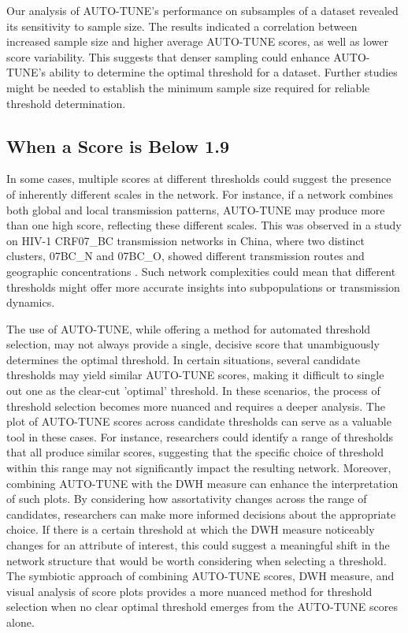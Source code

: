 \documentclass[utf8]{FrontiersinHarvard} %
\begin{document}
Our analysis of AUTO-TUNE's performance on subsamples of a dataset revealed its
sensitivity to sample size. The results indicated a correlation between
increased sample size and higher average AUTO-TUNE scores, as well as lower
score variability. This suggests that denser sampling could enhance AUTO-TUNE's
ability to determine the optimal threshold for a dataset. Further studies might
be needed to establish the minimum sample size required for reliable threshold
determination.

\subsection{When a Score is Below 1.9}

In some cases, multiple scores at different thresholds could suggest the
presence of inherently different scales in the network. For instance, if a
network combines both global and local transmission patterns, AUTO-TUNE may
produce more than one high score, reflecting these different scales. This was
observed in a study on HIV-1 CRF07\_BC transmission networks in China, where
two distinct clusters, 07BC\_N and 07BC\_O, showed different transmission
routes and geographic concentrations \citep{ding_characterizing_2022}. Such
network complexities could mean that different thresholds might offer more
accurate insights into subpopulations or transmission dynamics.

The use of AUTO-TUNE, while offering a method for automated threshold
selection, may not always provide a single, decisive score that unambiguously
determines the optimal threshold. In certain situations, several candidate
thresholds may yield similar AUTO-TUNE scores, making it difficult to single
out one as the clear-cut 'optimal' threshold. In these scenarios, the process
of threshold selection becomes more nuanced and requires a deeper analysis. The
plot of AUTO-TUNE scores across candidate thresholds can serve as a valuable
tool in these cases. For instance, researchers could identify a range of
thresholds that all produce similar scores, suggesting that the specific choice
of threshold within this range may not significantly impact the resulting
network. Moreover, combining AUTO-TUNE with the DWH measure can enhance the
interpretation of such plots. By considering how assortativity changes across
the range of candidates, researchers can make more informed decisions about the
appropriate choice. If there is a certain threshold at which the DWH measure
noticeably changes for an attribute of interest, this could suggest a
meaningful shift in the network structure that would be worth considering when
selecting a threshold. The symbiotic approach of combining AUTO-TUNE scores,
DWH measure, and visual analysis of score plots provides a more nuanced method
for threshold selection when no clear optimal threshold emerges from the
AUTO-TUNE scores alone.
\end{document}
